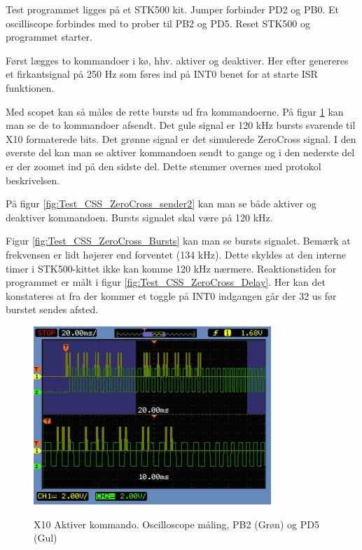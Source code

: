 Test programmet ligges på et STK500 kit.
Jumper forbinder PD2 og PB0. Et oscilliscope forbindes med to prober til PB2 og PD5.
Reset STK500 og programmet starter.

Først lægges to kommandoer i kø, hhv. aktiver og deaktiver. Her efter genereres et firkantsignal på 250 Hz som føres ind på INT0 benet for at starte ISR funktionen.

Med scopet kan så måles de rette bursts ud fra kommandoerne. På figur \ref{fig:Test_CSS_ZeroCross_sender1} kan man se de to kommandoer afsendt. Det gule signal er 120 kHz bursts svarende til X10 formaterede bits. Det grønne signal er det simulerede ZeroCross signal. I den øverste del kan man se aktiver kommandoen sendt to gange og i den nederste del er der zoomet ind på den sidste del. Dette stemmer overnes med protokol beskrivelsen.

På figur \ref{fig:Test_CSS_ZeroCross_sender2} kan man se både aktiver og deaktiver kommandoen.
Bursts signalet skal være på 120 kHz. 

Figur \ref{fig:Test_CSS_ZeroCross_Bursts} kan man se bursts signalet. Bemærk at frekvensen er lidt højerer end forventet (134 kHz). Dette skyldes at den interne timer i STK500-kittet ikke kan komme 120 kHz nærmere.
Reaktionstiden for programmet er målt i figur \ref{fig:Test_CSS_ZeroCross_Delay}. Her kan det konstateres at fra der kommer et toggle på INT0 indgangen går der 32 us før burstet sendes afsted.

\begin{figure}[!htb]
	\centering
     {\includegraphics[width=0.8\textwidth]{billeder/SWTest/X10IF_Test_Afsend_1_kommando}}
     \caption{X10 Aktiver kommando. Oscilloscope måling, PB2 (Grøn) og PD5 (Gul)}
     \label{fig:Test_CSS_ZeroCross_sender1}
\end{figure}

